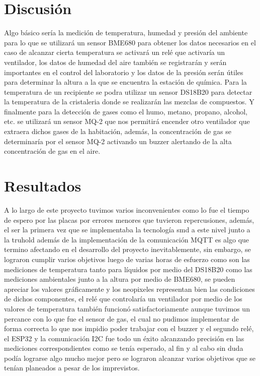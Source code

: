 \documentclass[10pt,twocolumn,letterpaper]{article}
\begin{document}
\begin{Abstract}
\section{Discusión}
Algo básico sería la medición de temperatura, humedad y presión del ambiente para lo que se utilizará un sensor BME680 para obtener los datos necesarios en el caso de alcanzar cierta temperatura se activará un relé que activaría un ventilador, los datos de humedad del aire también se registrarán y serán importantes en el control del laboratorio y los datos de la presión serán útiles para determinar la altura a la que se encuentra la estación de química. Para la temperatura de un recipiente se podra utilizar un sensor DS18B20 para detectar la temperatura de la cristaleria donde se realizarán las mezclas de compuestos. Y finalmente para la detección de gases como el humo, metano, propano, alcohol, etc. se utilizará un sensor MQ-2 que nos permitirá encender otro ventilador que extraera dichos gases de la habitación, además, la concentración de gas se determinaría  por el sensor MQ-2 activando un buzzer alertando de la alta concentración de gas en el aire.

\section{Resultados}

A lo largo de este proyecto tuvimos varios inconvenientes como lo fue el tiempo de espero por las placas por errores menores que tuvieron repercusiones, además, el ser la primera vez que se implementaba la tecnología smd a este nivel junto a la truhold además de la implementación de la comunicación MQTT es algo que termino afectando en el desarrollo del proyecto inevitablemente, sin embargo, se lograron cumplir varios objetivos luego de varias horas de esfuerzo como son las mediciones de temperatura tanto para líquidos por medio del DS18B20 como las mediciones ambientales junto a la altura por medio de BME680, se pueden apreciar los valores gráficamente y los neopixeles representan bien las condiciones de dichos componentes, el relé que controlaría un ventilador por medio de los valores de temperatura también funcionó satisfactoriamente aunque tuvimos un percance con lo que fue el sensor de gas, el cual no pudimos implementar de forma correcta lo que nos impidio poder trabajar con el buzzer y el segundo relé, el ESP32 y la comunicación I2C fue todo un éxito alcanzando precisión en las mediciones correspondientes como se tenía esperado, al fin y al cabo sin duda podía lograrse algo mucho mejor pero se lograron alcanzar varios objetivos que se tenían planeados a pesar de los imprevistos.


\end{Abstract}
\end{document}
